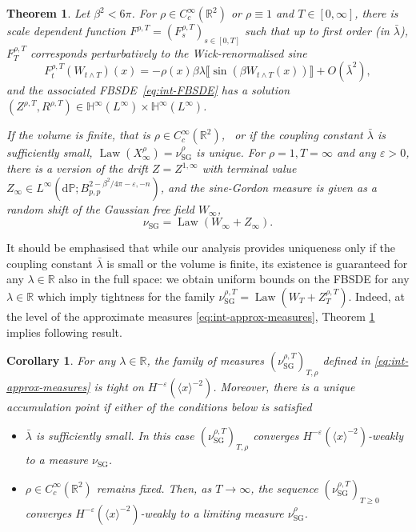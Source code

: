 \documentclass[11pt, a4paper]{scrartcl}
\numberwithin{equation}{section}
\theoremstyle{plain}
\newtheorem{theorem}[foo]{Theorem}
\newtheorem{corollary}[foo]{Corollary}
\theoremstyle{remark}
\newcommand{\mathd}{\mathrm{d}}
\newcommand{\tmop}[1]{\ensuremath{\operatorname{#1}}}
\begin{document}
\begin{theorem}
	\label{thm:int-wp}Let $\beta^2 < 6 \pi$. For $\rho \in C^{\infty}_c
		(\mathbb{R}^2)$ or $\rho \equiv 1$ and $T \in [0, \infty]$, there is scale
	dependent function $F^{\rho, T} = (F^{\rho, T}_s)_{s \in [0, T]}$ such that
	up to first order (in $\bar{\lambda}$),
	$F^{\rho, T}_T$ corresponds perturbatively to the Wick-renormalised sine
	\[ F^{\rho, T}_t (W_{t\wedge T}) (x) = - \rho (x) \beta \lambda \llbracket \sin (\beta
		W_{t\wedge T} (x)) \rrbracket + O(\bar{\lambda}^2),\]
	and the associated FBSDE~\eqref{eq:int-FBSDE} has a solution~$(Z^{\rho, T},
		R^{\rho, T}) \in \mathbb{H}^{\infty} (L^{\infty}) \times \mathbb{H}^{\infty}
		(L^{\infty})$.

	If the volume is finite, that is $\rho \in C^{\infty}_c (\mathbb{R}^2)$, \
	or if the coupling constant $\bar{\lambda}$ is sufficiently small, $\tmop{Law}(X_\infty^\rho)=\nu_{\tmop{SG}}^\rho$ is unique. For $\rho = 1, T = \infty$ and any $\varepsilon > 0$,
	there is a version of the drift $Z = Z^{1, \infty}$ with terminal value
	$Z_{\infty} \in L^{\infty} (\mathd \mathbb{P} ; B_{p, p}^{2 - \beta^2 / 4 \pi -
				\varepsilon, - n})$, and the sine-Gordon measure is given as a random shift
	of the Gaussian free field $W_{\infty}$,
	\[ \nu_{\tmop{SG}} = \tmop{Law} (W_{\infty} + Z_{\infty}) . \]
\end{theorem}
It should be emphasised that while our analysis provides uniqueness only if
the coupling constant $\bar{\lambda}$ is small or the volume is finite, its
existence is guaranteed for any $\lambda \in \mathbb{R}$ also in the full
space: we obtain uniform bounds on the FBSDE for any $\lambda \in \mathbb{R}$
which imply tightness for the family $\nu_{\tmop{SG}}^{\rho, T} = \tmop{Law}
	(W_T + Z^{\rho, T}_T)$. Indeed, at the level of the approximate measures \eqref{eq:int-approx-measures}, Theorem \ref{thm:int-wp} implies following result.
\begin{corollary}
	For any $\lambda\in \mathbb R$, the family of measures $(\nu_{\tmop{SG}}^{\rho,T})_{T,\rho}$ defined in \eqref{eq:int-approx-measures} is tight on $H^{-\varepsilon}(\langle x\rangle^{-2})$. Moreover, there is a unique accumulation point if either of the conditions below is satisfied
	\begin{itemize}
		\item $\bar{\lambda}$ is sufficiently small. In this case $(\nu_{\tmop{SG}}^{\rho,T})_{T,\rho}$ converges $H^{-\varepsilon}(\langle x\rangle^{-2})$-weakly to a measure $\nu_{\tmop{SG}}$.
		\item $\rho\in C^\infty_c(\mathbb{R}^2)$ remains fixed. Then, as $T\to\infty$, the sequence $(\nu_{\tmop{SG}}^{\rho,T})_{T\geqslant 0}$ converges $H^{-\varepsilon}(\langle x\rangle^{-2})$-weakly to a limiting measure $\nu_{\tmop{SG}}^\rho$.
	\end{itemize}
\end{corollary}
\end{document}
